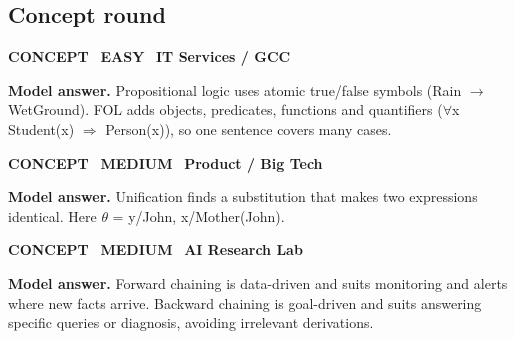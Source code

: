 \documentclass[11pt]{article}
\begin{document}
\subsection*{\color{teal}Concept round}
\begin{tcolorbox}[enhanced,breakable,colback=white,colframe=teal,arc=2mm,boxrule=0.8pt,left=3mm,right=3mm,
 title={\textbf{QIII.01}\quad Differentiate propositional logic and first-order logic with an example.},fonttitle=\color{white}\small,colbacktitle=teal]
\colorbox{teal!15}{\scriptsize\bfseries\color{teal} CONCEPT}\
\colorbox{leaf!15}{\scriptsize\bfseries\color{leaf} EASY}\
\colorbox{navy!8}{\scriptsize\bfseries\color{navy} IT Services / GCC}\par\smallskip
\textbf{\color{navy}Model answer.} Propositional logic uses atomic true/false symbols (Rain $\to$ WetGround). FOL adds objects, predicates, functions and quantifiers ($\forall$x Student(x) $\Rightarrow$ Person(x)), so one sentence covers many cases.
\end{tcolorbox}
\begin{tcolorbox}[enhanced,breakable,colback=white,colframe=teal,arc=2mm,boxrule=0.8pt,left=3mm,right=3mm,
 title={\textbf{QIII.02}\quad What is unification? Unify Knows(John, x) with Knows(y, Mother(y)).},fonttitle=\color{white}\small,colbacktitle=teal]
\colorbox{teal!15}{\scriptsize\bfseries\color{teal} CONCEPT}\
\colorbox{gold!85!black!15}{\scriptsize\bfseries\color{gold!85!black} MEDIUM}\
\colorbox{navy!8}{\scriptsize\bfseries\color{navy} Product / Big Tech}\par\smallskip
\textbf{\color{navy}Model answer.} Unification finds a substitution that makes two expressions identical. Here $\theta$ = {y/John, x/Mother(John)}.
\end{tcolorbox}
\begin{tcolorbox}[enhanced,breakable,colback=white,colframe=teal,arc=2mm,boxrule=0.8pt,left=3mm,right=3mm,
 title={\textbf{QIII.03}\quad Forward vs backward chaining --- when do you prefer each?},fonttitle=\color{white}\small,colbacktitle=teal]
\colorbox{teal!15}{\scriptsize\bfseries\color{teal} CONCEPT}\
\colorbox{gold!85!black!15}{\scriptsize\bfseries\color{gold!85!black} MEDIUM}\
\colorbox{navy!8}{\scriptsize\bfseries\color{navy} AI Research Lab}\par\smallskip
\textbf{\color{navy}Model answer.} Forward chaining is data-driven and suits monitoring and alerts where new facts arrive. Backward chaining is goal-driven and suits answering specific queries or diagnosis, avoiding irrelevant derivations.
\end{tcolorbox}
\end{document}
